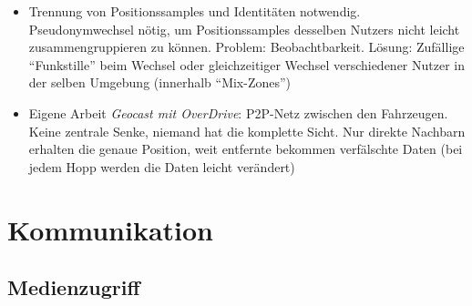 \begin{itemize}
\begin{itemize}
		\item Trennung von Positionssamples und Identitäten notwendig. Pseudonymwechsel nötig, um Positionssamples desselben Nutzers nicht leicht zusammengruppieren zu können. Problem: Beobachtbarkeit. Lösung: Zufällige "`Funkstille"' beim Wechsel oder gleichzeitiger Wechsel verschiedener Nutzer in der selben Umgebung (innerhalb "`Mix-Zones"')
		\item Eigene Arbeit \textit{Geocast mit OverDrive}: P2P-Netz zwischen den Fahrzeugen. Keine zentrale Senke, niemand hat die komplette Sicht. Nur direkte Nachbarn erhalten die genaue Position, weit entfernte bekommen verfälschte Daten (bei jedem Hopp werden die Daten leicht verändert)
	\end{itemize}
\end{itemize}



\section{Kommunikation}

\subsection{Medienzugriff}

